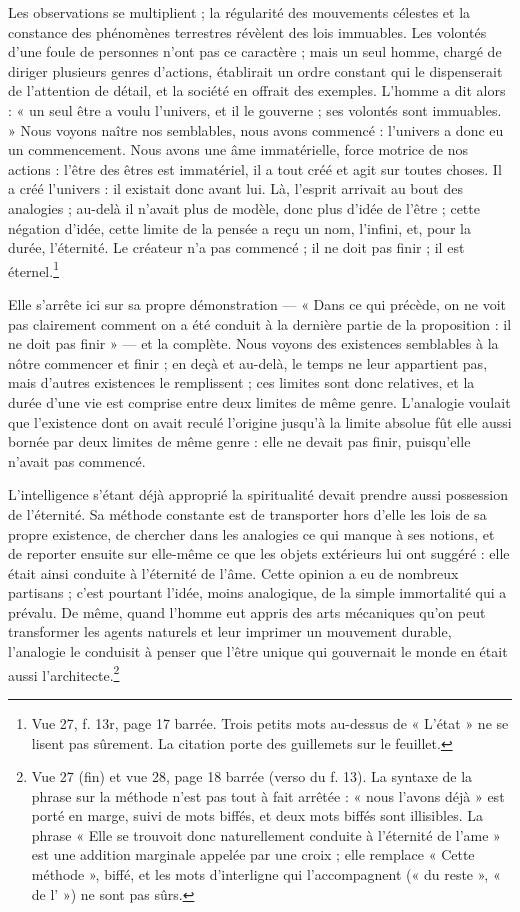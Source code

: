 \documentclass[11pt,a4paper]{article}
\begin{document}
Les observations se multiplient ; la régularité des mouvements célestes et la
constance des phénomènes terrestres révèlent des lois immuables. Les volontés
d'une foule de personnes n'ont pas ce caractère ; mais un seul homme, chargé de
diriger plusieurs genres d'actions, établirait un ordre constant qui le
dispenserait de l'attention de détail, et la société en offrait des exemples.
L'homme a dit alors : « un seul être a voulu l'univers, et il le gouverne ; ses
volontés sont immuables. » Nous voyons naître nos semblables, nous avons
commencé : l'univers a donc eu un commencement. Nous avons une âme immatérielle,
force motrice de nos actions : l'être des êtres est immatériel, il a tout créé
et agit sur toutes choses. Il a créé l'univers : il existait donc avant lui.
Là, l'esprit arrivait au bout des analogies ; au-delà il n'avait plus de
modèle, donc plus d'idée de l'être ; cette négation d'idée, cette limite de la
pensée a reçu un nom, l'infini, et, pour la durée, l'éternité. Le créateur n'a
pas commencé ; il ne doit pas finir ; il est éternel.\footnote{Vue 27, f. 13r,
page 17 barrée. Trois petits mots au-dessus de « L'état » ne se lisent pas
sûrement. La citation porte des guillemets sur le feuillet.}

Elle s'arrête ici sur sa propre démonstration — « Dans ce qui précède, on ne
voit pas clairement comment on a été conduit à la dernière partie de la
proposition : il ne doit pas finir » — et la complète. Nous voyons des
existences semblables à la nôtre commencer et finir ; en deçà et au-delà, le
temps ne leur appartient pas, mais d'autres existences le remplissent ; ces
limites sont donc relatives, et la durée d'une vie est comprise entre deux
limites de même genre. L'analogie voulait que l'existence dont on avait reculé
l'origine jusqu'à la limite absolue fût elle aussi bornée par deux limites de
même genre : elle ne devait pas finir, puisqu'elle n'avait pas commencé.

L'intelligence s'étant déjà approprié la spiritualité devait prendre aussi
possession de l'éternité. Sa méthode constante est de transporter hors d'elle
les lois de sa propre existence, de chercher dans les analogies ce qui manque à
ses notions, et de reporter ensuite sur elle-même ce que les objets extérieurs
lui ont suggéré : elle était ainsi conduite à l'éternité de l'âme. Cette
opinion a eu de nombreux partisans ; c'est pourtant l'idée, moins analogique,
de la simple immortalité qui a prévalu. De même, quand l'homme eut appris des
arts mécaniques qu'on peut transformer les agents naturels et leur imprimer un
mouvement durable, l'analogie le conduisit à penser que l'être unique qui
gouvernait le monde en était aussi l'architecte.\footnote{Vue 27 (fin) et vue
28, page 18 barrée (verso du f. 13). La syntaxe de la phrase sur la méthode
n'est pas tout à fait arrêtée : « nous l'avons déjà » est porté en marge, suivi
de mots biffés, et deux mots biffés sont illisibles. La phrase « Elle se
trouvoit donc naturellement conduite à l'éternité de l'ame » est une addition
marginale appelée par une croix ; elle remplace « Cette méthode », biffé, et les
mots d'interligne qui l'accompagnent (« du reste », « de l' ») ne sont pas
sûrs.}
\end{document}
